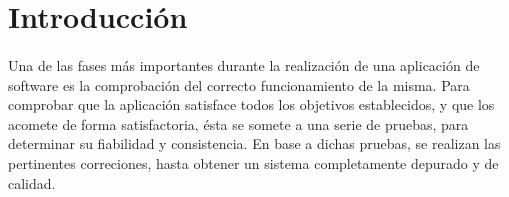 \section{Introducción}

  \paragraph{}Una de las fases más importantes durante la realización de una
  aplicación de software es la comprobación del correcto funcionamiento de la
  misma. Para comprobar que la aplicación satisface todos los objetivos
  establecidos, y que los acomete de forma satisfactoria, ésta se somete a una
  serie de pruebas, para determinar su fiabilidad y consistencia. En base a
  dichas pruebas, se realizan las pertinentes correciones, hasta obtener un
  sistema completamente depurado y de calidad.
